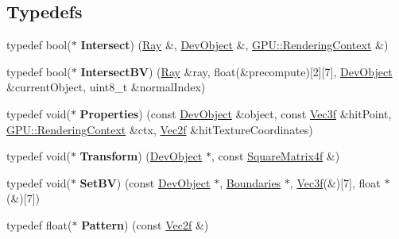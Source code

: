 \subsection*{Typedefs}
\begin{DoxyCompactItemize}
\item 
typedef bool($\ast$ {\bfseries Intersect}) (\hyperlink{class_ray}{Ray} \&, \hyperlink{class_dev_object}{Dev\+Object} \&, \hyperlink{struct_g_p_u_1_1_rendering_context}{G\+P\+U\+::\+Rendering\+Context} \&)\hypertarget{group__device__pointers_gadd5691b4d1b8e3d72a8b279063574170}{}\label{group__device__pointers_gadd5691b4d1b8e3d72a8b279063574170}

\item 
typedef bool($\ast$ {\bfseries Intersect\+BV}) (\hyperlink{class_ray}{Ray} \&ray, float(\&precompute)\mbox{[}2\mbox{]}\mbox{[}7\mbox{]}, \hyperlink{class_dev_object}{Dev\+Object} \&current\+Object, uint8\+\_\+t \&normal\+Index)\hypertarget{group__device__pointers_ga651ba9f838240bd32d8ad85a1deec6ce}{}\label{group__device__pointers_ga651ba9f838240bd32d8ad85a1deec6ce}

\item 
typedef void($\ast$ {\bfseries Properties}) (const \hyperlink{class_dev_object}{Dev\+Object} \&object, const \hyperlink{class_vec3}{Vec3f} \&hit\+Point, \hyperlink{struct_g_p_u_1_1_rendering_context}{G\+P\+U\+::\+Rendering\+Context} \&ctx, \hyperlink{class_vec2}{Vec2f} \&hit\+Texture\+Coordinates)\hypertarget{group__device__pointers_ga3db4cb2abc6918447914228ab5019d38}{}\label{group__device__pointers_ga3db4cb2abc6918447914228ab5019d38}

\item 
typedef void($\ast$ {\bfseries Transform}) (\hyperlink{class_dev_object}{Dev\+Object} $\ast$, const \hyperlink{class_square_matrix4}{Square\+Matrix4f} \&)\hypertarget{group__device__pointers_ga7342a43dc846e3462f53f5af48daeab2}{}\label{group__device__pointers_ga7342a43dc846e3462f53f5af48daeab2}

\item 
typedef void($\ast$ {\bfseries Set\+BV}) (const \hyperlink{class_dev_object}{Dev\+Object} $\ast$, \hyperlink{class_boundaries}{Boundaries} $\ast$, \hyperlink{class_vec3}{Vec3f}(\&)\mbox{[}7\mbox{]}, float $\ast$(\&)\mbox{[}7\mbox{]})\hypertarget{group__device__pointers_gaf734749a4b67aed1bb494cb8000f870d}{}\label{group__device__pointers_gaf734749a4b67aed1bb494cb8000f870d}

\item 
typedef float($\ast$ {\bfseries Pattern}) (const \hyperlink{class_vec2}{Vec2f} \&)\hypertarget{group__device__pointers_gacb1d13948594101a67c3ec975d34e9b8}{}\label{group__device__pointers_gacb1d13948594101a67c3ec975d34e9b8}


\end{DoxyCompactItemize}
